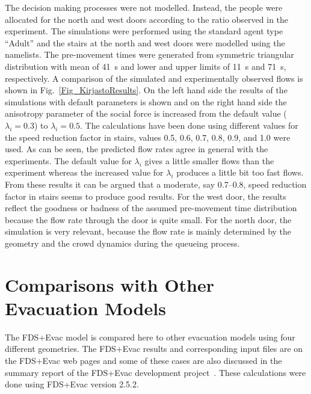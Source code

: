 \documentclass[12pt,a4paper,final,twoside]{stylevk}
\begin{document}
\begin{enumerate}
The decision making processes were not modelled.  Instead, the people
were allocated for the north and west doors according to the ratio
observed in the experiment.  The simulations were performed using the
standard agent type ``Adult'' and the stairs at the north and west
doors were modelled using the  namelists.  The
pre-movement times were generated from symmetric triangular
distribution with mean of 41~s and lower and upper limits of 11~s and
71~s, respectively.  A comparison of the simulated and experimentally
observed flows is shown in Fig.~\ref{Fig_KirjastoResults}.  On the
left hand side the results of the simulations with default parameters
is shown and on the right hand side the anisotropy parameter of the
social force is increased from the default value ($\lambda_i=0.3$) to
$\lambda_i=0.5$.  The calculations have been done using different
values for the speed reduction factor in stairs, values 0.5, 0.6, 0.7,
0.8, 0.9, and 1.0 were used.  As can be seen, the predicted flow rates
agree in general with the experiments.  The default value for
$\lambda_i$ gives a little smaller flows than the experiment whereas
the increased value for $\lambda_i$ produces a little bit too fast
flows.  From these results it can be argued that a moderate, say
0.7--0.8, speed reduction factor in stairs seems to produce good
results.  For the west door, the results reflect the goodness or
badness of the assumed pre-movement time distribution because the flow
rate through the door is quite small.  For the north door, the
simulation is very relevant, because the flow rate is mainly
determined by the geometry and the crowd dynamics during the queueing
process.
%
%
\end{enumerate}
%







\section{Comparisons with Other Evacuation
  Models}\label{Sec_CompOtherModels} 

\noindent The FDS+Evac model is compared here to other evacuation
models using four different geometries.  The FDS+Evac results and
corresponding input files are on the FDS+Evac web pages and some of
these cases are also discussed in the summary report of the FDS+Evac
development project~\cite{Hostikka07a}.  These calculations were done
using FDS+Evac version 2.5.2.
%
\end{document}
